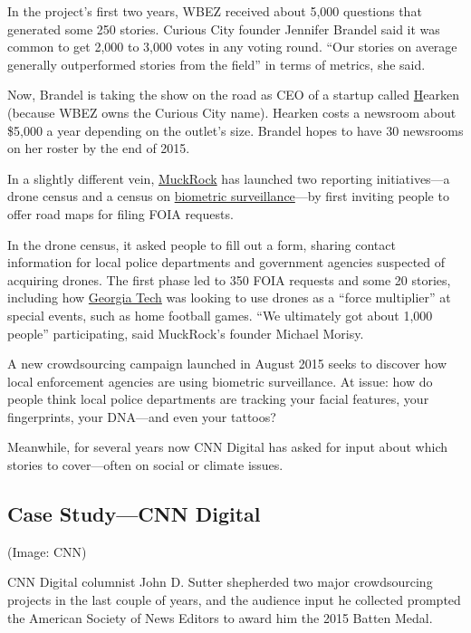 \begin{itemize}
\begin{enumerate}
In the project’s first two years, WBEZ received about 5,000 questions that generated some 250 stories. Curious City founder Jennifer Brandel said it was common to get 2,000 to 3,000 votes in any voting round. “Our stories on average generally outperformed stories from the field” in terms of metrics, she said.\autocite{Brandel}  

Now, Brandel is taking the show on the road as CEO of a startup called \href{http://www.wearehearken.com/}Hearken\autocite{Hearken} (because WBEZ owns the Curious City name). Hearken costs a newsroom about \$5,000 a year depending on the outlet’s size. Brandel hopes to have 30 newsrooms on her roster by the end of 2015.

In a slightly different vein, \href{https://www.muckrock.com/}{MuckRock} has launched two reporting initiatives---a drone census and a census on \href{https://www.muckrock.com/news/archives/2015/aug/04/street-level-surveillance-who-using-mobile-biometr/}{biometric surveillance}---by first inviting people to offer road maps for filing FOIA requests.\autocite{Morisy}

In the drone census, it asked people to fill out a form, sharing contact information for local police departments and government agencies suspected of acquiring drones. The first phase led to 350 FOIA requests and some 20 stories, including how \href{https://www.muckrock.com/news/archives/2013/jan/24/georgia-tech-police-wanted-fly-surveillance-drone-/}{Georgia Tech}\autocite{Drone}
was looking to use drones as a ``force multiplier'' at special events, such as home football games. ``We ultimately got about 1,000 people'' participating, said MuckRock’s founder Michael Morisy.\autocite{Morisy}

A new crowdsourcing campaign launched in August 2015 seeks to discover how local enforcement agencies are using biometric surveillance.\autocite{surveillance} At issue: how do people think local police departments are tracking your facial features, your fingerprints, your DNA---and even your tattoos?\autocite{Morisy}

Meanwhile, for several years now CNN Digital has asked for input about which stories to cover---often on social or climate issues.

\subsection{Case Study---CNN Digital} (Image: CNN) 

CNN Digital columnist John D. Sutter shepherded two major crowdsourcing projects in the last couple of years, and the audience input he collected prompted the American Society of News Editors to award him the 2015 Batten Medal.


\end{enumerate}
\end{itemize}

